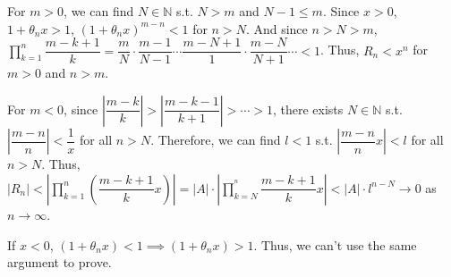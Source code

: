 \documentclass[12pt]{article}
\begin{document}
\begin{enumerate}
    For $m > 0$, we can find $N\in \mathbb{N}$ s.t. $N > m$ and $N-1 \leq m$.
    Since $x > 0$, $1 + \theta_n x > 1$, $(1+\theta_n x)^{m-n} < 1$ for $n > N$.
    And since $n > N > m$, $\displaystyle\prod_{k=1}^{n}\dfrac{m-k+1}{k} = \dfrac{m}{N} \cdot \dfrac{m-1}{N-1} \cdots \dfrac{m-N+1}{1} \cdot \dfrac{m-N}{N+1}\cdots < 1$.
    Thus, $R_n < x^n$ for $m > 0$ and $n > m$.
    
    For $m < 0$, since $|\dfrac{m-k}{k}| > |\dfrac{m-k-1}{k+1}| > \cdots > 1$,
    there exists $N\in \mathbb{N}$ s.t. $|\dfrac{m-n}{n}| < \dfrac{1}{x}$ for all $n > N$.
    Therefore, we can find $l < 1$ s.t. $|\dfrac{m-n}{n}x| < l$ for all $n > N$.
    Thus, $|R_n| < |\displaystyle\prod_{k=1}^{n} (\dfrac{m-k+1}{k}x)| = |A|\cdot |\displaystyle\prod_{k=N}^{^n} \dfrac{m-k+1}{k}x| < |A|\cdot l^{n-N} \to 0$ as $n\to\infty$.

    If $x < 0$, $(1 + \theta_n x) < 1\implies (1 +\theta_n x) > 1$.
    Thus, we can't use the same argument to prove.
\end{enumerate}
\end{document}
